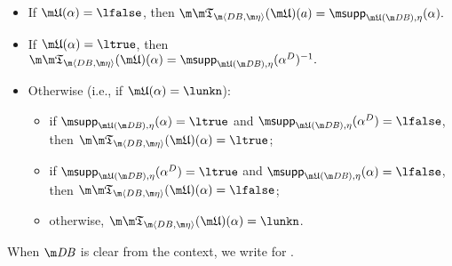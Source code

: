 \begin{definition}
\begin{itemize}
 \item If $\UUU(\alpha)=\lfalse$, then $\Apfull(\UUU)(a) = \supp_{\UUU(\db),\eta}(\alpha).$
 \item If $\UUU(\alpha)=\ltrue$, then $\Apfull(\UUU)(\alpha) = \supp_{\UUU(\db),\eta}(\alpha^D)^{-1}.$
 \item Otherwise (i.e., if $\UUU(\alpha) = \lunkn$):
  \begin{itemize}
    \item if $\supp_{\UUU(\db),\eta}(\alpha) = \ltrue$ and $\supp_{\UUU(\db),\eta}(\alpha^D)=\lfalse$, then $\Apfull(\UUU)( \alpha)=\ltrue$;
    \item if $\supp_{\UUU(\db),\eta}(\alpha^D) = \ltrue$ and $\supp_{\UUU(\db),\eta}(\alpha)=\lfalse$, then $\Apfull(\UUU)(\alpha)=\lfalse$;
    \item otherwise, $\Apfull(\UUU)(\alpha)=\lunkn$.
\end{itemize}

\end{itemize}
When $\db$ is clear from the context, we write \Ap for \Apfull.
 
\end{definition}
% 

